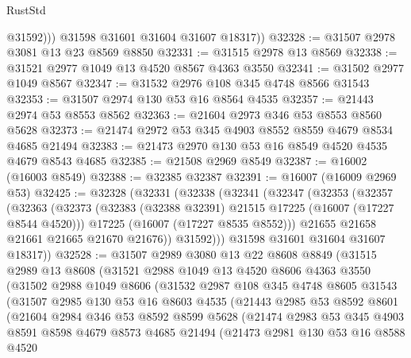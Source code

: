 \begin{lexlean}{RustStd}
\begin{coremodule}
              @31592)))
        @31598
        @31601
        @31604
        @31607
        @18317))
@32328 := @31507 @2978 @3081 @13 @23 @8569 @8850
@32331 := @31515 @2978 @13 @8569
@32338 := @31521 @2977 @1049 @13 @4520 @8567 @4363 @3550
@32341 := @31502 @2977 @1049 @8567
@32347 := @31532 @2976 @108 @345 @4748 @8566 @31543
@32353 := @31507 @2974 @130 @53 @16 @8564 @4535
@32357 := @21443 @2974 @53 @8553 @8562
@32363 := @21604 @2973 @346 @53 @8553 @8560 @5628
@32373 := @21474 @2972 @53 @345 @4903 @8552 @8559 @4679 @8534 @4685 @21494
@32383 := @21473 @2970 @130 @53 @16 @8549 @4520 @4535 @4679 @8543 @4685
@32385 := @21508 @2969 @8549
@32387 := @16002 (@16003 @8549)
@32388 := @32385 @32387
@32391 := @16007 (@16009 @2969 @53)
@32425 := @32328
    (@32331
      (@32338
        (@32341
          (@32347
            (@32353
              (@32357
                (@32363
                  (@32373
                    (@32383 (@32388 @32391) @21515 @17225 (@16007 (@17227 @8544 @4520)))
                    @17225
                    (@16007 (@17227 @8535 @8552)))
                  @21655
                  @21658
                  @21661
                  @21665
                  @21670
                  @21676))
              @31592)))
        @31598
        @31601
        @31604
        @31607
        @18317))
@32528 := @31507
    @2989
    @3080
    @13
    @22
    @8608
    @8849
    (@31515
      @2989
      @13
      @8608
      (@31521
        @2988
        @1049
        @13
        @4520
        @8606
        @4363
        @3550
        (@31502
          @2988
          @1049
          @8606
          (@31532
            @2987
            @108
            @345
            @4748
            @8605
            @31543
            (@31507
              @2985
              @130
              @53
              @16
              @8603
              @4535
              (@21443
                @2985
                @53
                @8592
                @8601
                (@21604
                  @2984
                  @346
                  @53
                  @8592
                  @8599
                  @5628
                  (@21474
                    @2983
                    @53
                    @345
                    @4903
                    @8591
                    @8598
                    @4679
                    @8573
                    @4685
                    @21494
                    (@21473
                      @2981
                      @130
                      @53
                      @16
                      @8588
                      @4520

\end{coremodule}
\end{lexlean}
